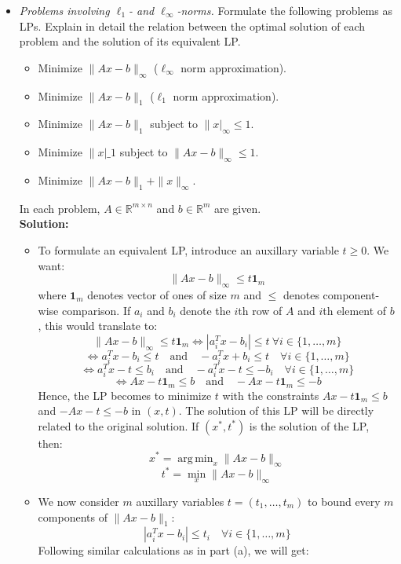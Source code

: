 \documentclass{article}
\DeclareMathOperator*{\argmin}{arg\,min}
\begin{document}
\begin{itemize}
  \item[4.11] \textit{Problems involving $\ell_1$- and $\ell_\infty$-norms.} Formulate the following problems as LPs. Explain in detail the relation between the optimal solution of each problem and the solution of its equivalent LP.
  \begin{itemize}
    \item[(a)] Minimize $\|Ax - b\|_\infty$ ($\ell_\infty$ norm approximation).
    \item[(b)] Minimize $\|Ax - b\|_1$ ($\ell_1$ norm approximation).
    \item[(c)] Minimize $\|Ax - b\|_1$ subject to $\|x|_\infty \le 1$.
    \item[(d)] Minimize $\|x|\_1$ subject to $\|Ax - b\|_\infty \le 1$.
    \item[(e)] Minimize $\|Ax - b\|_1 + \|x\|_\infty$.
  \end{itemize}
  In each problem, $A \in \mathbb{R}^{m \times n}$ and $b \in \mathbb{R}^m$ are given. \\
  \textbf{Solution:}
  \begin{itemize}
    \item[(a)] To formulate an equivalent LP, introduce an auxillary variable $t \ge 0$. We want:
    \[ \|Ax - b\|_\infty \le t \mathbf{1}_m \]
    where $\mathbf{1}_m$ denotes vector of ones of size $m$ and $\le$ denotes component-wise comparison.
    If $a_i$ and $b_i$ denote the $i$th row of $A$ and $i$th element of $b$, this would translate to:
    \[ \|Ax - b\|_\infty \le t \mathbf{1}_m \iff |a_i^Tx - b_i| \le t ~ \forall i \in \{1, \dots, m\} \]
    \[ \iff a_i^T x - b_i \le t \quad \text{and} \quad -a_i^Tx + b_i \le t \quad \forall i \in \{1, \dots, m\} \]
    \[ \iff a_i^T x - t \le b_i \quad \text{and} \quad -a_i^Tx - t \le -b_i \quad \forall i \in \{1, \dots, m\} \]
    \[ \iff Ax - t \mathbf{1}_m \le b \quad \text{and} \quad -Ax - t \mathbf{1}_m \le -b \]
    Hence, the LP becomes to minimize $t$ with the constraints $Ax - t \mathbf{1}_m \le b$ and $-Ax - t \le -b$ in $(x, t)$.
    The solution of this LP will be directly related to the original solution. If $(x^*, t^*)$ is the solution of the LP, then:
    \[ x^* = \argmin_x \|Ax - b\|_\infty \]
    \[ t^* = \min_x \|Ax - b\|_\infty \]
    \item[(b)] We now consider $m$ auxillary variables $t = (t_1, \dots, t_m)$ to bound every $m$ components of $\|Ax - b\|_1$:
    \[ |a_i^T x - b_i| \le t_i \quad \forall i \in \{1, \dots, m\} \]
    Following similar calculations as in part (a), we will get:

\end{itemize}
\end{itemize}
\end{document}
